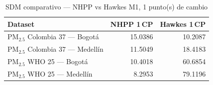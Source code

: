 \begin{table}[htbp]
\centering
\caption{SDM comparativo --- NHPP vs Hawkes M1, 1 punto(s) de cambio}
\label{tab:comp_sdm_1cp}
\begin{tabular}{lrr}
\toprule
Dataset & NHPP 1\,CP & Hawkes 1\,CP \\
\midrule
PM$_{2.5}$ Colombia 37 --- Bogot\'{a} & 15.0386 & 10.2087 \\
PM$_{2.5}$ Colombia 37 --- Medell\'{i}n & 11.5049 & 18.4183 \\
PM$_{2.5}$ WHO 25 --- Bogot\'{a} & 10.4018 & 60.6854 \\
PM$_{2.5}$ WHO 25 --- Medell\'{i}n & 8.2953 & 79.1196 \\
\bottomrule
\end{tabular}
\end{table}
